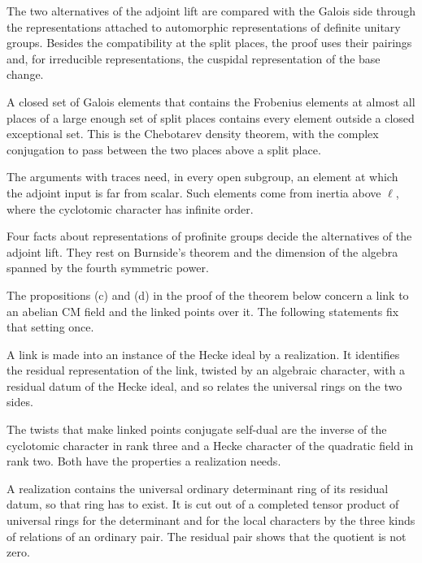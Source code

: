The two alternatives of the adjoint lift are compared with the Galois side through the representations attached to automorphic representations of definite unitary groups. Besides the compatibility at the split places, the proof uses their pairings and, for irreducible representations, the cuspidal representation of the base change.

A closed set of Galois elements that contains the Frobenius elements at almost all places of a large enough set of split places contains every element outside a closed exceptional set. This is the Chebotarev density theorem, with the complex conjugation to pass between the two places above a split place.

The arguments with traces need, in every open subgroup, an element at which the adjoint input is far from scalar. Such elements come from inertia above $\ell$, where the cyclotomic character has infinite order.

Four facts about representations of profinite groups decide the alternatives of the adjoint lift. They rest on Burnside's theorem and the dimension of the algebra spanned by the fourth symmetric power.

The propositions (c) and (d) in the proof of the theorem below concern a link to an abelian CM field and the linked points over it. The following statements fix that setting once.

A link is made into an instance of the Hecke ideal by a realization. It identifies the residual representation of the link, twisted by an algebraic character, with a residual datum of the Hecke ideal, and so relates the universal rings on the two sides.

The twists that make linked points conjugate self-dual are the inverse of the cyclotomic character in rank three and a Hecke character of the quadratic field in rank two. Both have the properties a realization needs.

A realization contains the universal ordinary determinant ring of its residual datum, so that ring has to exist. It is cut out of a completed tensor product of universal rings for the determinant and for the local characters by the three kinds of relations of an ordinary pair. The residual pair shows that the quotient is not zero.

